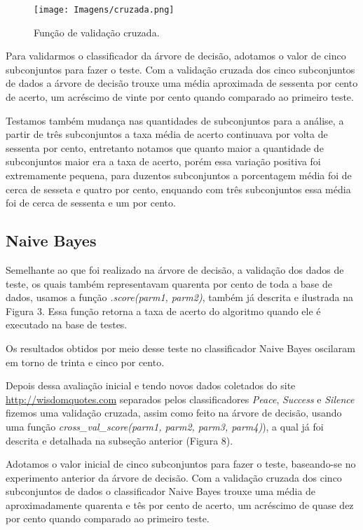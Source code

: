 \documentclass[preprint,12pt,times]{elsarticle}
\begin{document}
	\begin{figure}[h]
		\centering\texttt{[image: Imagens/cruzada.png]}
		\caption{Função de validação cruzada.}
	\end{figure}

	Para validarmos o classificador da árvore de decisão, adotamos o valor de cinco subconjuntos para fazer o teste. Com a validação cruzada dos cinco subconjuntos de dados a árvore de decisão trouxe uma média aproximada de sessenta por cento de acerto, um acréscimo de vinte por cento quando comparado ao primeiro teste.
	
	Testamos também mudança nas quantidades de subconjuntos para a análise, a partir de três subconjuntos a taxa média de acerto continuava por volta de sessenta por cento, entretanto notamos que quanto maior a quantidade de subconjuntos maior era a taxa de acerto, porém essa variação positiva foi extremamente pequena, para duzentos subconjuntos a porcentagem média foi de cerca de sesseta e quatro por cento, enquando com três subconjuntos essa média foi de cerca de sessenta e um por cento.
	
	\subsection{Naive Bayes}
	Semelhante ao que foi realizado na árvore de decisão, a validação dos dados de teste, os quais também representavam quarenta por cento de toda a base de dados, usamos a função \textit{.score(parm1, parm2)}, também já descrita e ilustrada na Figura 3. Essa função retorna a taxa de acerto do algoritmo quando ele é executado na base de testes. 
	
	Os resultados obtidos por meio desse teste no classificador Naive Bayes oscilaram em torno de trinta e cinco por cento.
	
	Depois dessa avaliação inicial e tendo novos dados coletados do site \url{http://wisdomquotes.com} separados pelos classificadores \textit{Peace}, \textit{Success} e \textit{Silence} fizemos uma validação cruzada, assim como feito na árvore de decisão, usando uma função \textit{cross\_val\_score(parm1, parm2, parm3, parm4)}), a qual já foi descrita e detalhada na subseção anterior (Figura 8).
	
	Adotamos o valor inicial de cinco subconjuntos para fazer o teste, baseando-se no experimento anterior da árvore de decisão. Com a validação cruzada dos cinco subconjuntos de dados o classificador Naive Bayes trouxe uma média de aproximadamente  quarenta e tês por cento de acerto, um acréscimo de quase dez por cento quando comparado ao primeiro teste.
	
\end{document}
